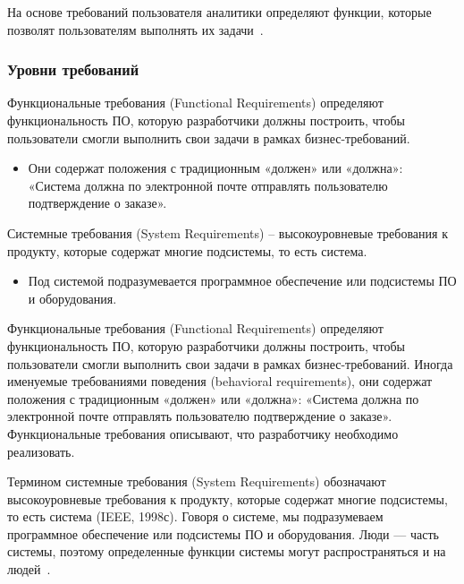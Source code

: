 \documentclass{../industrial-development}
\begin{document}
На основе требований пользователя аналитики определяют функции, которые позволят пользователям выполнять их задачи~\cite[с.~11]{Wiegers}.


\begin{frame} \frametitle{Уровни требований}
  \begin{block}{}
\alert{Функциональные требования (Functional Requirements)} определяют функциональность ПО, которую разработчики должны построить, чтобы пользователи смогли выполнить свои задачи в рамках бизнес-требований.
  \end{block}
 \begin{itemize}
\item Они содержат положения с традиционным «должен» или «должна»: «Система должна по электронной почте отправлять пользователю подтверждение о заказе».
 \end{itemize}
\begin{block}{}
\alert{Системные требования (System Requirements)} -- высокоуровневые требования к продукту, которые содержат многие подсистемы, то есть система.
  \end{block}
 	\begin{itemize}
\item Под системой подразумевается программное обеспечение или подсистемы ПО и оборудования.
	\end{itemize}
\end{frame}

\lecturenotes

\alert{Функциональные требования (Functional Requirements)} определяют функциональность ПО, которую разработчики должны построить, чтобы пользователи смогли выполнить свои задачи в рамках бизнес-требований. Иногда именуемые требованиями поведения (behavioral requirements), они содержат положения с традиционным «должен» или «должна»: «Система должна по электронной почте отправлять пользователю подтверждение о заказе». Функциональные требования описывают, что разработчику необходимо реализовать.

Термином \alert{системные требования (System Requirements)} обозначают высокоуровневые требования к продукту, которые содержат многие подсистемы, то есть система (IEEE, 1998с). Говоря о системе, мы подразумеваем программное обеспечение или подсистемы ПО и оборудования. Люди — часть системы, поэтому определенные функции системы могут распространяться и на людей~\cite[с.~9]{Wiegers}.
\end{document}

